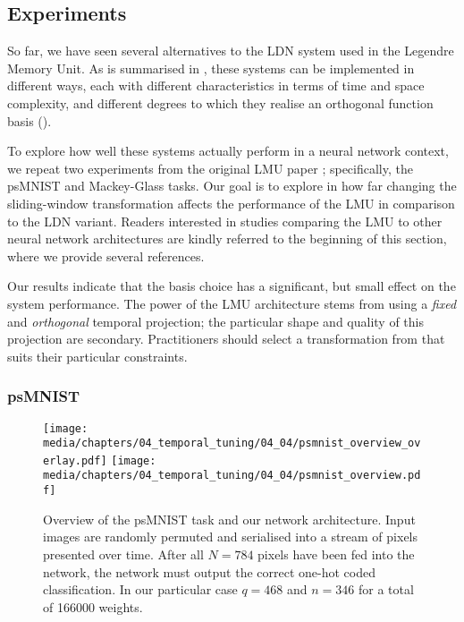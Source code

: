 \subsection{Experiments}
\label{sec:lmu_experiments}

So far, we have seen several alternatives to the LDN system used in the Legendre Memory Unit.
As is summarised in , these systems can be implemented in different ways, each with different characteristics in terms of time and space complexity, and different degrees to which they realise an orthogonal function basis ().

To explore how well these systems actually perform in a neural network context, we repeat two experiments from the original LMU paper \citep{voelker2019lmu}; specifically, the psMNIST and Mackey-Glass tasks.
Our goal is to explore in how far changing the sliding-window transformation affects the performance of the LMU in comparison to the LDN variant.
Readers interested in studies comparing the LMU to other neural network architectures are kindly referred to the beginning of this section, where we provide several references.

Our results indicate that the basis choice has a significant, but small effect on the system performance.
The power of the LMU architecture stems from using a \emph{fixed} and \emph{orthogonal} temporal projection; the particular shape and quality of this projection are secondary.
Practitioners should select a transformation from  that suits their particular constraints.

\subsubsection{psMNIST}

\begin{figure}
	\texttt{[image: media/chapters/04\_temporal\_tuning/04\_04/psmnist\_overview\_overlay.pdf]}%
	\kern-158mm\texttt{[image: media/chapters/04\_temporal\_tuning/04\_04/psmnist\_overview.pdf]}%
	\caption[Overview of the psMNIST task and our network architecture]{Overview of the psMNIST task and our network architecture.
	Input images are randomly permuted and serialised into a stream of pixels presented over time.
	After all $N = 784$ pixels have been fed into the network, the network must output the correct one-hot coded classification.
	In our particular case $q = 468$ and $n = 346$ for a total of \num{166000} weights.}
	\label{fig:psmnist_overview}
\end{figure}

